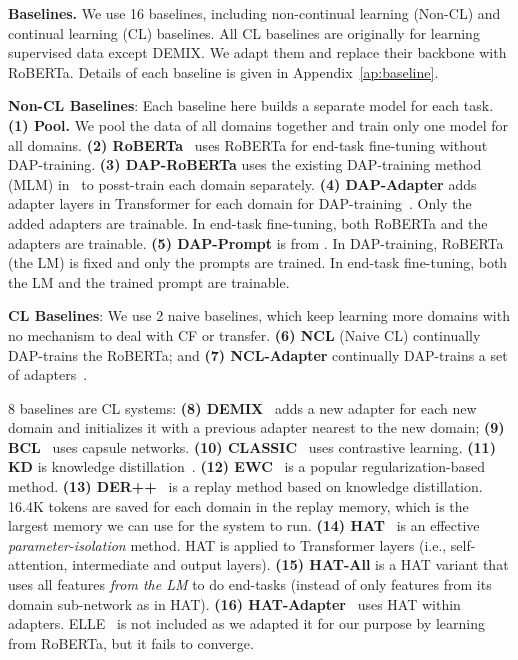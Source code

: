 \documentclass{article} \usepackage{iclr2023_conference,times}
\begin{document}
\noindent
\textbf{Baselines.} We use 16 baselines, including non-continual learning (Non-CL) and continual learning (CL) baselines. {\color{black}All CL baselines are originally for learning supervised data except DEMIX.} We adapt them and replace their backbone with RoBERTa. Details of each baseline is given in Appendix~\ref{ap:baseline}. 

\textbf{Non-CL Baselines}: Each baseline here builds a separate model for each
task.  {\color{black}\textbf{(1) Pool. } We pool the data of all domains together and train only one model for all domains. }
\textbf{(2) RoBERTa}~\citep{DBLP:journals/corr/abs-1907-11692} uses RoBERTa for end-task fine-tuning without DAP-training. \textbf{(3) DAP-RoBERTa} uses the existing DAP-training method (MLM) in~\citep{DBLP:conf/acl/GururanganMSLBD20} to posst-train each domain separately. \textbf{(4) DAP-Adapter} adds adapter
layers in Transformer for each domain for DAP-training~\citep{jang2021continual,madotto2020continual,Houlsby2019Parameter}. Only the added adapters are trainable. In end-task fine-tuning, both RoBERTa and the adapters are trainable.  \textbf{(5) DAP-Prompt} is from \citep{DBLP:conf/emnlp/LesterAC21}. In DAP-training, RoBERTa (the LM) is fixed and only the prompts are trained. In end-task fine-tuning, both the LM and the trained prompt are trainable. 


\textbf{CL Baselines}: We use 2 naive baselines, which keep learning more domains with no mechanism to deal with CF or transfer. \textbf{(6) NCL} (Naive CL) continually DAP-trains the RoBERTa; and \textbf{(7) NCL-Adapter} continually DAP-trains a set of adapters~\citep{Houlsby2019Parameter}. 

8 baselines are CL systems: \textbf{(8) DEMIX}~\citep{gururangan2021demix} adds a new adapter for each new domain and initializes it with a previous adapter nearest to the new domain; 
\textbf{(9) BCL}~\citep{ke2021adapting} uses capsule networks. 
\textbf{(10) CLASSIC}~\citep{ke2021Classic} uses contrastive learning. \textbf{(11) KD} is knowledge distillation~\citep{hinton2015distilling}. \textbf{(12) EWC}~\citep{buzzega2020dark} is a popular
regularization-based method. \textbf{(13) DER++}~\citep{buzzega2020dark} is a replay method based on knowledge distillation. 16.4K tokens are saved for each domain in the replay memory, which is the largest memory we can use for the system to run. \textbf{(14) HAT}~\citep{Serra2018overcoming} is an effective \textit{parameter-isolation} method. HAT is applied to Transformer layers (i.e., self-attention, intermediate and output layers). {\color{black}\textbf{(15) HAT-All} is a HAT variant that uses all features \textit{from the LM} to do end-tasks (instead of only features from its domain sub-network as in HAT).} \textbf{(16) HAT-Adapter}~\citep{ke2021adapting} uses HAT within adapters.  ELLE~\citep{DBLP:conf/acl/QinZLL0SZ22} is not included as we adapted it for our purpose by learning from RoBERTa, {but it fails to converge.}  
\end{document}
